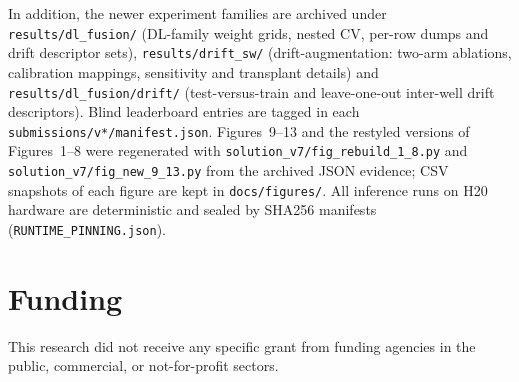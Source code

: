 \documentclass[preprint,12pt]{elsarticle}
\begin{document}
In addition, the newer experiment families are archived under \texttt{results/dl\_fusion/} (DL-family weight grids, nested CV, per-row dumps and drift descriptor sets), \texttt{results/drift\_sw/} (drift-augmentation: two-arm ablations, calibration mappings, sensitivity and transplant details) and \texttt{results/dl\_fusion/drift/} (test-versus-train and leave-one-out inter-well drift descriptors). Blind leaderboard entries are tagged in each \texttt{submissions/v*/manifest.json}. Figures~9--13 and the restyled versions of Figures~1--8 were regenerated with \texttt{solution\_v7/fig\_rebuild\_1\_8.py} and \texttt{solution\_v7/fig\_new\_9\_13.py} from the archived JSON evidence; CSV snapshots of each figure are kept in \texttt{docs/figures/}. All inference runs on H20 hardware are deterministic and sealed by SHA256 manifests (\texttt{RUNTIME\_PINNING.json}).

\section*{Funding}
This research did not receive any specific grant from funding agencies in the public, commercial, or not-for-profit sectors.



\end{document}
